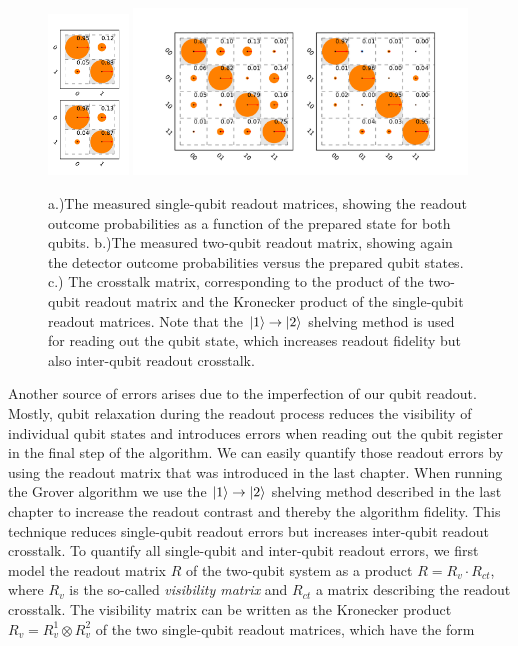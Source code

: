 \begin{figure}[ht!]
	\centering
\includegraphics[width=0.19\textwidth]{"./data/ct5/2011_04_21 - grover and tomo/good_data/single qubit readouts"}
\includegraphics[width=0.79\textwidth]{"./data/ct5/2011_04_21 - grover and tomo/good_data/readout and crosstalk - 2 plots"}
	\caption[Measured single- and two-qubit readout matrices and crosstalk matrix for the Grover search algorithm experiment]{a.)The measured single-qubit readout matrices, showing the readout outcome probabilities as a function of the prepared state for both qubits. b.)The measured two-qubit readout matrix, showing again the detector outcome probabilities versus the prepared qubit states. c.) The crosstalk matrix, corresponding to the product of the two-qubit readout matrix and the Kronecker product of the single-qubit readout matrices. Note that the $\left| 1 \right>\to\left| 2 \right>$ shelving method is used for reading out the qubit state, which increases readout fidelity but also inter-qubit readout crosstalk.}
	\label{fig:GroverReadoutMatrix}
\end{figure}

Another source of errors arises due to the imperfection of our qubit readout. Mostly, qubit relaxation during the readout process reduces the visibility of individual qubit states and introduces errors when reading out the qubit register in the final step of the algorithm. We can easily quantify those readout errors by using the readout matrix that was introduced in the last chapter. When running the Grover algorithm we use the $\left| 1 \right>\to\left| 2 \right>$ shelving method described in the last chapter to increase the readout contrast and thereby the algorithm fidelity. This technique reduces single-qubit readout errors but increases inter-qubit readout crosstalk. To quantify all single-qubit and inter-qubit readout errors, we first model the readout matrix $R$ of the two-qubit system as a product $R=R_{v}\cdot R_{ct}$, where $R_{v}$ is the so-called {\it visibility matrix} and $R_{ct}$ a matrix describing the readout crosstalk. The visibility matrix can be written as the Kronecker product $R_{v} = R_{v}^1 \otimes R_{v}^2$ of the two single-qubit readout matrices, which have the form

